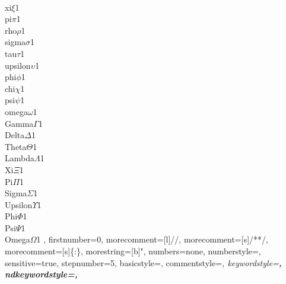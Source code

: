 {        {\\xi}{$\xi$}1
        {\\pi}{$\pi$}1
        {\\rho}{$\rho$}1
        {\\sigma}{$\sigma$}1
        {\\tau}{$\tau$}1
        {\\upsilon}{$\upsilon$}1
        {\\phi}{$\phi$}1
        {\\chi}{$\chi$}1
        {\\psi}{$\psi$}1
        {\\omega}{$\omega$}1
        {\\Gamma}{$\Gamma$}1
        {\\Delta}{$\Delta$}1
        {\\Theta}{$\Theta$}1
        {\\Lambda}{$\Lambda$}1
        {\\Xi}{$\Xi$}1
        {\\Pi}{$\Pi$}1
        {\\Sigma}{$\Sigma$}1
        {\\Upsilon}{$\Upsilon$}1
        {\\Phi}{$\Phi$}1
        {\\Psi}{$\Psi$}1
        {\\Omega}{$\Omega$}1
    ,
    firstnumber=0,
    morecomment=[l]{//},
    morecomment=[s]{/*}{*/},
    morecomment=[s]{\{:}{\}},
    morestring=[b]",
    numbers=none,
    numberstyle=\tiny,
    sensitive=true,  %
    stepnumber=5,
    basicstyle=\scriptsize\sffamily,
    commentstyle=\itshape,
    keywordstyle=\bfseries,
    ndkeywordstyle=\bfseries,
}
